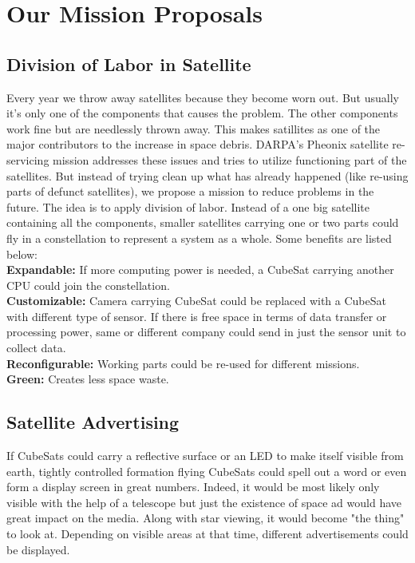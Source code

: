 \section{Our Mission Proposals}

\subsection{Division of Labor in Satellite}
Every year we throw away satellites because they become worn out. But usually it's only one of the components that causes the problem. The other components work fine but are needlessly thrown away. This makes satillites as one of the major contributors to the increase in space debris. DARPA's Pheonix satellite re-servicing mission addresses these issues and tries to utilize functioning part of the satellites. But instead of trying clean up what has already happened (like  re-using parts of defunct satellites), we propose a mission to reduce problems in the future.
The idea is to apply division of labor. Instead of a one big satellite containing all the components, smaller satellites carrying one or two parts could fly in a constellation to represent a system as a whole. Some benefits are listed below: \\

{\bf Expandable:} If more computing power is needed, a CubeSat carrying another CPU could join the constellation. \\
 
{\bf Customizable:} Camera carrying CubeSat could be replaced with a CubeSat with different type of sensor.
If there is free space in terms of data transfer or processing power, same or different company could send in just the sensor unit to collect data. \\

{\bf Reconfigurable:} Working parts could be re-used for different missions.\\

{\bf Green:} Creates less space waste.

\subsection{Satellite Advertising}
If CubeSats could carry a reflective surface or an LED to make itself visible from earth, tightly controlled formation flying CubeSats could spell out a word or even form a display screen in great numbers. Indeed, it would be most likely only visible with the help of a telescope but just the existence of space ad would have great impact on the media. Along with star viewing, it would become "the thing" to look at. Depending on visible areas at that time, different advertisements could be displayed.

